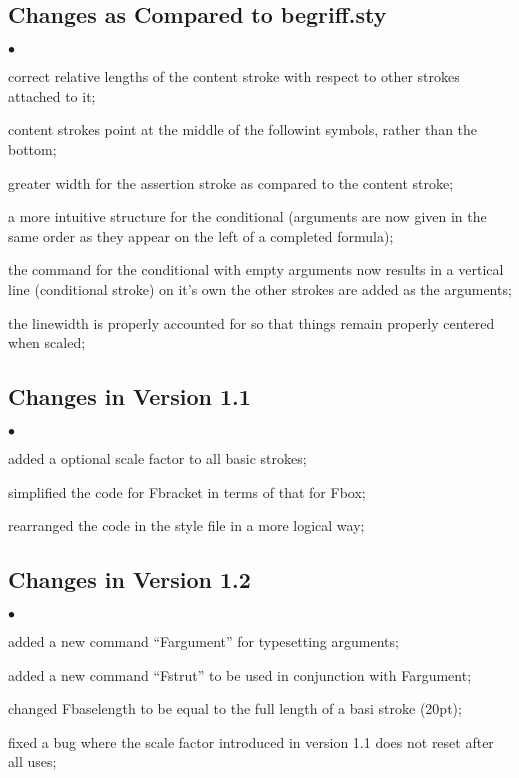\documentclass[12pt]{article}
\newcommand{\squishlist}{
  \begin{list}{$\bullet$}{
    \setlength{\itemsep}{0pt}
    \setlength{\parsep}{0pt}
    \setlength{\topsep}{0pt}
    \setlength{\partopsep}{0pt}
    \setlength{\leftmargin}{1em}
    \setlength{\labelwidth}{1em}
    \setlength{\parskip}{0pt}
    \setlength{\partopsep}{0pt}
    \setlength{\rightmargin}{0pt}
    \setlength{\labelsep}{0.5em}}}
\newcommand{\squishlistend}{\end{list}}
\begin{document}
\subsection{Changes as Compared to begriff.sty}
  \squishlist
    \item correct relative lengths of the content stroke with respect to other 
      strokes attached to it;
    \item content strokes point at the middle of the followint symbols, rather 
      than the bottom;
    \item greater width for the assertion stroke as compared to the content stroke;
    \item a more intuitive structure for the conditional (arguments are now given in 
      the same order as they appear on the left of a completed formula);
    \item the command for the conditional with empty arguments now results in a 
      vertical line (conditional stroke) on it's own the other strokes are added as   
      the arguments;
    \item the linewidth is properly accounted for so that things remain properly 
      centered when scaled;
  \squishlistend

\subsection{Changes in Version 1.1}
  \squishlist
    \item added a optional scale factor to all basic strokes;
    \item simplified the code for Fbracket in terms of that for Fbox;
    \item rearranged the code in the style file in a more logical way;
  \squishlistend

\subsection{Changes in Version 1.2}
  \squishlist
    \item added a new command ``Fargument'' for typesetting arguments;
    \item added a new command ``Fstrut'' to be used in conjunction with Fargument;
    \item changed Fbaselength to be equal to the full length of a basi stroke (20pt);
    \item fixed a bug where the scale factor introduced in version 1.1 does not reset 
      after all uses;
  \squishlistend
\end{document}
